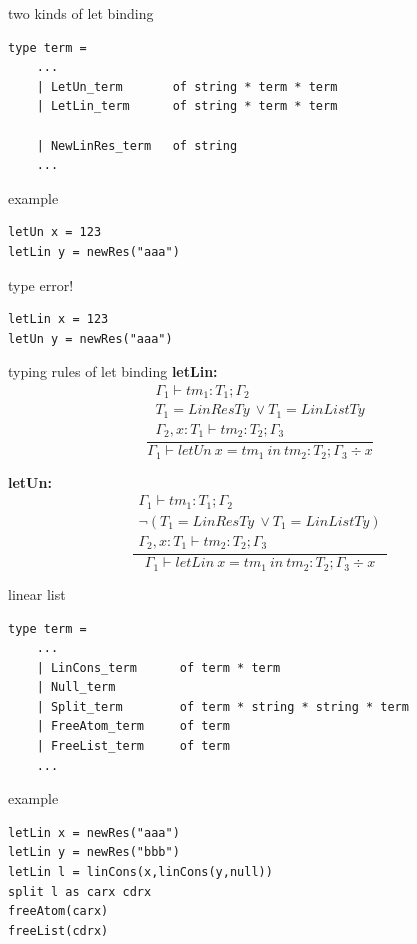 \documentclass[10pt]{beamer}
\begin{document}
\begin{frame}[fragile]{two kinds of let binding}
\begin{verbatim}
type term =
    ...
    | LetUn_term       of string * term * term
    | LetLin_term      of string * term * term 
   
    | NewLinRes_term   of string
    ...
\end{verbatim}

\begin{exampleblock}{example}
\begin{verbatim}
letUn x = 123
letLin y = newRes("aaa")
\end{verbatim}	
\end{exampleblock}

\begin{alertblock}{type error!}
\begin{verbatim}
letLin x = 123
letUn y = newRes("aaa")
\end{verbatim}	
\end{alertblock}

\end{frame}



\begin{frame}[fragile]{typing rules of let binding}
\textbf{letLin:}
\[
	\frac
	{
		\begin{array}{c}
			\Gamma_1 \vdash tm_1 : T_1 ; \Gamma_2 \\
			T_1 = LinResTy\ \vee T_1 = LinListTy \\
			\Gamma_2, x:T_1 \vdash tm_2 : T_2 ; \Gamma_3			
		\end{array}
	}
	{
		\Gamma_1 \vdash letUn\ x = tm_1\ in\ tm_2 : T_2 ; \Gamma_3 \div x
	}
\]

\textbf{letUn:}
\[
	\frac
	{
		\begin{array}{c}
			\Gamma_1 \vdash tm_1 : T_1 ; \Gamma_2 \\
			\neg (T_1 = LinResTy\ \vee T_1 = LinListTy) \\
			\Gamma_2, x:T_1 \vdash tm_2 : T_2 ; \Gamma_3			
		\end{array}
	}
	{
		\Gamma_1 \vdash letLin\ x = tm_1\ in\ tm_2 : T_2 ; \Gamma_3 \div x
	}
\]
\end{frame}



\begin{frame}[fragile]{linear list}
\begin{verbatim}
type term =
    ...
    | LinCons_term      of term * term
    | Null_term
    | Split_term        of term * string * string * term
    | FreeAtom_term     of term
    | FreeList_term     of term
    ...
\end{verbatim}

\begin{exampleblock}{example}
\begin{verbatim}
letLin x = newRes("aaa")
letLin y = newRes("bbb")
letLin l = linCons(x,linCons(y,null))
split l as carx cdrx
freeAtom(carx)
freeList(cdrx)
\end{verbatim}	
\end{exampleblock}
\end{frame}
\end{document}
